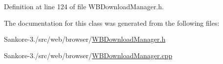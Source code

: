 Definition at line 124 of file W\-B\-Download\-Manager.\-h.



The documentation for this class was generated from the following files\-:\begin{DoxyCompactItemize}
\item 
Sankore-\/3./src/web/browser/\hyperlink{_w_b_download_manager_8h}{W\-B\-Download\-Manager.\-h}\item 
Sankore-\/3./src/web/browser/\hyperlink{_w_b_download_manager_8cpp}{W\-B\-Download\-Manager.\-cpp}\end{DoxyCompactItemize}
